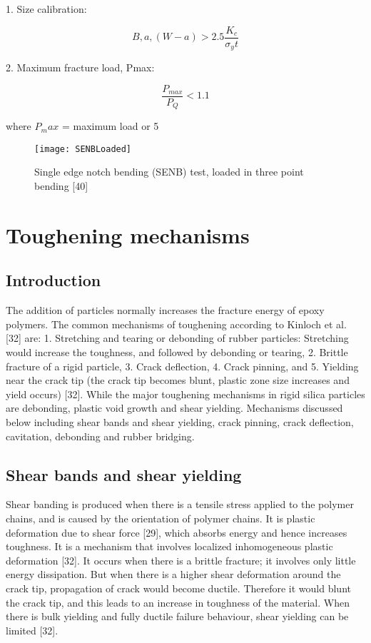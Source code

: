 \documentclass[numbers=noendperiod,chapterprefix=on]{icldt} %
\begin{document}
1. Size calibration:

\begin{equation} 
B,a,(W-a)>2.5 \frac{K_c}{σ_yt}
\end{equation}

2. Maximum fracture load, Pmax:

\begin{equation} 
\frac{P_{max}}{P_Q}<1.1
\end{equation}

where $P_max$ = maximum load or 5%

\begin{figure}[!htpb]
\centering
\texttt{[image: SENBLoaded]}
\caption{Single edge notch bending (SENB) test, loaded in three point bending [40]} %
\end{figure}

\section{Toughening mechanisms}
\subsection{Introduction}
The addition of particles normally increases the fracture energy of epoxy polymers. The common mechanisms of toughening according to Kinloch et al. [32] are: 1. Stretching and tearing or debonding of rubber particles: Stretching would increase the toughness, and followed by debonding or tearing, 2. Brittle fracture of a rigid particle, 3. Crack deflection, 4. Crack pinning, and 5. Yielding near the crack tip (the crack tip becomes blunt, plastic zone size increases and yield occurs) [32]. While the major toughening mechanisms in rigid silica particles are debonding, plastic void growth and shear yielding. Mechanisms discussed below including shear bands and shear yielding, crack pinning, crack deflection, cavitation, debonding and rubber bridging.

\subsection{Shear bands and shear yielding}
Shear banding is produced when there is a tensile stress applied to the polymer chains, and is caused by the orientation of polymer chains. It is plastic deformation due to shear force [29], which absorbs energy and hence increases toughness. It is a mechanism that involves localized inhomogeneous plastic deformation [32]. It occurs when there is a brittle fracture; it involves only little energy dissipation. But when there is a higher shear deformation around the crack tip, propagation of crack would become ductile. Therefore it would blunt the crack tip, and this leads to an increase in toughness of the material. When there is bulk yielding and fully ductile failure behaviour, shear yielding can be limited [32]. 
\end{document}
